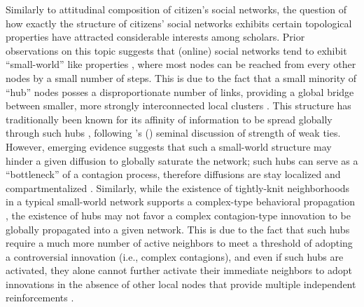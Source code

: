 \documentclass[man, 12pt, a4paper, nolmodern, noextraspace]{apa6}
\begin{document}
    Similarly to attitudinal composition of citizen's social networks, the question of how exactly the structure of citizens' social networks exhibits certain topological properties have attracted considerable interests among scholars. Prior observations on this topic suggests that (online) social networks tend to exhibit \enquote{small-world} like properties \parencite{kumar2010structure, ugander2011anatomy}, where most nodes can be reached from every other nodes by a small number of steps. This is due to the fact that a small minority of \enquote{hub} nodes posses a disproportionate number of links, providing a global bridge between smaller, more strongly interconnected local clusters \parencite{barabasi2004linked}. This structure has traditionally been known for its affinity of information to be spread globally through such hubs \parencite[e.g.,][]{Bakshy_2012}, following \citeauthor{granovetter1977strength}'s (\citeyear{granovetter1977strength}) seminal discussion of strength of weak ties. However, emerging evidence suggests that such a small-world structure may hinder a given diffusion to globally saturate the network; such hubs can serve as a \enquote{bottleneck} of a contagion process, therefore diffusions are stay localized and compartmentalized \parencite[e.g.,][]{gonzalez2017decoding, centola2007complex, zhao2010weak}. Similarly, while the existence of tightly-knit neighborhoods in a typical small-world network supports a complex-type behavioral propagation \parencite[i.e., an innovation that runs counter to prevalent norms and values:][]{Centola2010Sience}, the existence of hubs may not favor a complex contagion-type innovation to be globally propagated into a given network. This is due to the fact that such hubs require a much more number of active neighbors to meet a threshold of adopting a controversial innovation (i.e., complex contagions), and even if such hubs are activated, they alone cannot further activate their immediate neighbors to adopt innovations in the absence of other local nodes that provide multiple independent reinforcements \parencite{Centola2007449, zhao2010weak, gonzalez2017decoding}. 
    
\end{document}
